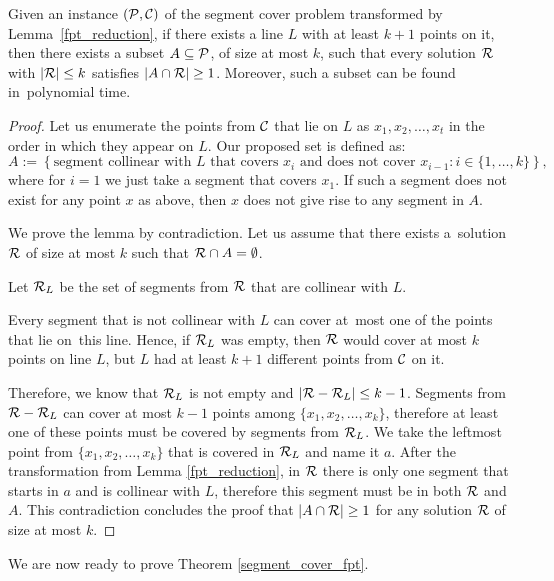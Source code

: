 \begin{lemma}
	\label{fpt_long_lines}
	Given an instance $(\mathcal{P}, \mathcal{C})$
	of the segment cover problem 
	transformed by Lemma~\ref{fpt_reduction},
	if there exists a line $L$ with at least
	$k+1$ points on it, then there exists a subset $A \subseteq \mathcal{P}$,
	of size at most $k$,
	such that every solution $\mathcal{R}$ with $|\mathcal{R}| \le k$
	satisfies $|A \cap \mathcal{R}| \ge 1$.
	Moreover, such a subset can be found in~polynomial time.
\end{lemma}
\begin{proof}
Let us enumerate the points from $\mathcal{C}$ that lie on $L$ as $x_1, x_2, \ldots, x_t$
in the order in which they appear on $L$.
Our proposed set is defined as:
$$A := \left\{ \text{segment collinear with } L \text{ that covers } x_i
\text{ and does not cover } x_{i-1} : i \in \{1, \ldots, k\}\right\},$$
where for $i = 1$ we just take a segment that covers $x_1$.
If such a segment does not exist for any point $x$
as above, then $x$ does not give rise to any segment in $A$.

We prove the lemma by contradiction. Let us assume that there
exists a~solution $\mathcal{R}$ of size at most $k$ such that $\mathcal{R} \cap A = \emptyset$.


Let $\mathcal{R}_L$ be the set of segments from $\mathcal{R}$ that are collinear with $L$.

Every segment that is not collinear with $L$ can cover at~most one of
the points that lie on~this line.
Hence, if $\mathcal{R}_L$ was empty, then
$\mathcal{R}$ would cover at most $k$ points on line $L$,
but $L$ had at least $k+1$ different points from $\mathcal{C}$ on it.

Therefore, we know that $\mathcal{R}_L$ is not empty
and $|\mathcal{R} - \mathcal{R}_L| \le k-1$.
Segments from $\mathcal{R} - \mathcal{R}_L$ can cover at most $k-1$
points among $\{x_1, x_2, \ldots, x_k\}$, therefore at least
one of these points must be covered by segments from $\mathcal{R}_L$.
We take the leftmost point from $\{x_1, x_2, \ldots, x_k\}$ that is
covered in $\mathcal{R}_L$ and name it $a$.
After the transformation from Lemma \ref{fpt_reduction},
in $\mathcal{R}$ there is only one segment
that starts in $a$ and is collinear with $L$,
therefore this segment must be in both $\mathcal{R}$ and $A$.
This contradiction concludes the proof that $|A \cap \mathcal{R}| \ge 1$
for any solution $\mathcal{R}$ of size at most $k$.
\end{proof}

We are now ready to prove Theorem \ref{segment_cover_fpt}.

